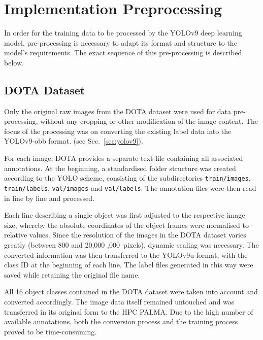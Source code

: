 

\section{Implementation Preprocessing}

In order for the training data to be processed by the YOLOv9 deep learning model, pre-processing is necessary to adapt its format and structure to the model's requirements. The exact sequence of this pre-processing is described below.
\subsection{DOTA Dataset}
Only the original raw images from the \acrshort{DOTA} dataset were used for data pre-processing, without any cropping or other modification of the image content. The focus of the processing was on converting the existing label data into the \acrshort{YOLO}v9-\acrshort{obb} format. (see Sec.~\ref{sec:yolov9}).

For each image, \acrshort{DOTA} provides a separate text file containing all associated annotations. At the beginning, a standardised folder structure was created according to the \acrshort{YOLO} scheme, consisting of the subdirectories \texttt{train/images}, \texttt{train/labels}, \texttt{val/images} and \texttt{val/labels}. The annotation files were then read in line by line and processed.

Each line describing a single object was first adjusted to the respective image size, whereby the absolute coordinates of the object frames were normalised to relative values. Since the resolution of the images in the \acrshort{DOTA} dataset varies greatly (between 800  and 20,000 ,000\ pixels), dynamic scaling was necessary. The converted information was then transferred to the \acrshort{YOLO}v9u format, with the class \acrshort{ID} at the beginning of each line. The label files generated in this way were saved while retaining the original file name.

All 16 object classes contained in the \acrshort{DOTA} dataset were taken into account and converted accordingly. The image data itself remained untouched and was transferred in its original form to the \acrshort{HPC} \acrshort{PALMA}. Due to the high number of available annotations, both the conversion process and the training process proved to be time-consuming.


